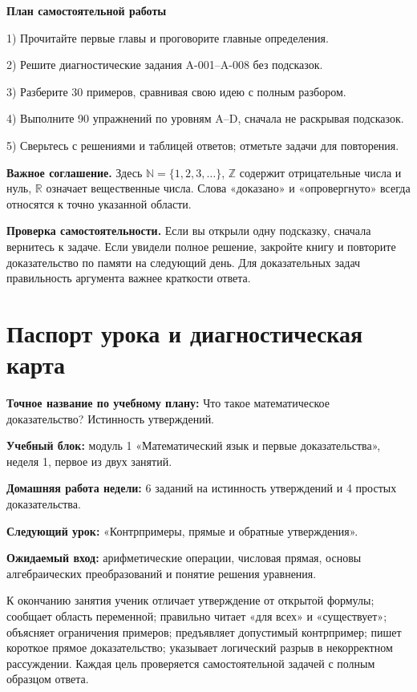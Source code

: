\documentclass[11pt,a4paper,openany]{book}
\begin{document}
\begin{keybox}
\textbf{План самостоятельной работы}\par
1) Прочитайте первые главы и проговорите главные определения.\par
2) Решите диагностические задания A-001–A-008 без подсказок.\par
3) Разберите 30 примеров, сравнивая свою идею с полным разбором.\par
4) Выполните 90 упражнений по уровням A–D, сначала не раскрывая подсказок.\par
5) Сверьтесь с решениями и таблицей ответов; отметьте задачи для повторения.
\end{keybox}
\textbf{Важное соглашение.} Здесь $\mathbb N=\{1,2,3,\dots\}$, $\mathbb Z$ содержит отрицательные числа и нуль, $\mathbb R$ означает вещественные числа. Слова «доказано» и «опровергнуто» всегда относятся к точно указанной области.\par
\textbf{Проверка самостоятельности.} Если вы открыли одну подсказку, сначала вернитесь к задаче. Если увидели полное решение, закройте книгу и повторите доказательство по памяти на следующий день. Для доказательных задач правильность аргумента важнее краткости ответа.
\tableofcontents
\chapter{Паспорт урока и диагностическая карта}
\begin{keybox}
\textbf{Точное название по учебному плану:} Что такое математическое доказательство? Истинность утверждений.\par
\textbf{Учебный блок:} модуль 1 «Математический язык и первые доказательства», неделя 1, первое из двух занятий.\par
\textbf{Домашняя работа недели:} 6 заданий на истинность утверждений и 4 простых доказательства.\par
\textbf{Следующий урок:} «Контрпримеры, прямые и обратные утверждения».\par
\textbf{Ожидаемый вход:} арифметические операции, числовая прямая, основы алгебраических преобразований и понятие решения уравнения.
\end{keybox}
К окончанию занятия ученик отличает утверждение от открытой формулы; сообщает область переменной; правильно читает «для всех» и «существует»; объясняет ограничения примеров; предъявляет допустимый контрпример; пишет короткое прямое доказательство; указывает логический разрыв в некорректном рассуждении. Каждая цель проверяется самостоятельной задачей с полным образцом ответа.
\end{document}
